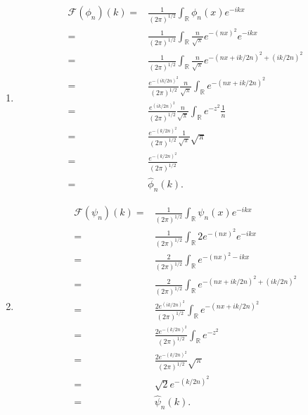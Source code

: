 \documentclass{article}
\begin{document}
\begin{enumerate}
\begin{enumerate}
					\item
						$$
						\begin{aligned}
						\mathcal{F}(\phi_{n})(k) = & \frac{1}{(2\pi)^{1/2}}\int_{\mathbb{R}} \phi_{n}(x)e^{-ikx}
						\\
						 = & \frac{1}{(2\pi)^{1/2}}\int_{\mathbb{R}} \frac{n}{\sqrt{\pi}}e^{-(nx)^{2}} e^{-ikx}
						 \\
						 = & \frac{1}{(2\pi)^{1/2}}\int_{\mathbb{R}} \frac{n}{\sqrt{\pi}}e^{-(nx + ik/2n)^{2} + (ik/2n)^{2}}
						 \\
						 = & \frac{e^{-(ik/2n)^{2}}}{(2\pi)^{1/2}} \frac{n}{\sqrt{\pi}} \int_{\mathbb{R}} e^{-(nx + ik/2n)^{2}}
						 \\
						 = & \frac{e^{(ik/2n)^{2}}}{(2\pi)^{1/2}} \frac{n}{\sqrt{\pi}} \int_{\mathbb{R}} e^{-z^{2}} \frac{1}{n}
						 \\
						 = & \frac{e^{-(k/2n)^{2}}}{(2\pi)^{1/2}} \frac{1}{\sqrt{\pi}} \sqrt{\pi}
						 \\
						 = & \frac{e^{-(k/2n)^{2}}}{(2\pi)^{1/2}}
						 \\
						 = & \hat{\phi}_{n}(k).
						\end{aligned}
						$$
					\item 
					$$
					\begin{aligned}
					\mathcal{F}(\psi_{n})(k) = & \frac{1}{(2\pi)^{1/2}}\int_{\mathbb{R}} \psi_{n}(x)e^{-ikx}
					\\
					= & \frac{1}{(2\pi)^{1/2}}\int_{\mathbb{R}}  2 e^{-(nx)^{2}}e^{-ikx}
					\\
					= & \frac{2}{(2\pi)^{1/2}}\int_{\mathbb{R}} e^{-(nx)^{2} -ikx }
					\\
					= & \frac{2}{(2\pi)^{1/2}}\int_{\mathbb{R}} e^{-(nx + ik/2n)^{2} + (ik/2n)^{2}}
					\\
					= & \frac{2e^{(ik/2n)^{2}} }{(2\pi)^{1/2}}\int_{\mathbb{R}} e^{-(nx + ik/2n)^{2} }
					\\
					= & \frac{2e^{-(k/2n)^{2}} }{(2\pi)^{1/2}}\int_{\mathbb{R}} e^{-z^{2} }
					\\
					= & \frac{2 e^{-(k/2n)^{2}} }{(2\pi)^{1/2}} \sqrt{\pi}
					\\
					= & \sqrt{2} e^{-(k/2n)^{2}}
					\\
					= & \hat{\psi}_{n}(k). 
					\end{aligned}
					$$
			\end{enumerate}
	\end{enumerate}
	
	
\end{document}
